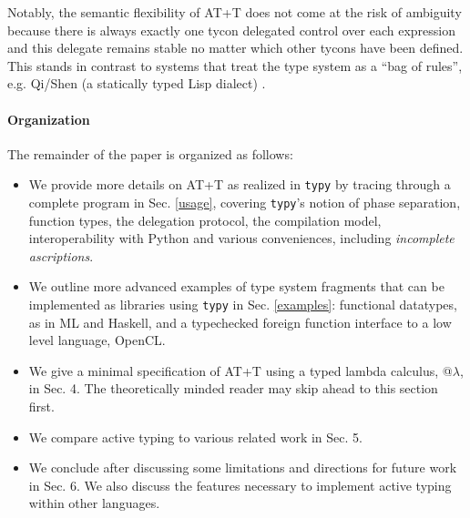\documentclass[preprint,10pt]{sigplanconf}
\begin{document}

Notably, the semantic flexibility of AT+T does not come at the risk of ambiguity  because there is always exactly one tycon delegated  control over each expression and this delegate remains stable no matter which other tycons have been defined. This stands in contrast to systems that treat the type system as a ``bag of rules'', e.g. Qi/Shen (a statically typed Lisp dialect) \cite{tarver2008functional}.%


\paragraph{Organization} The remainder of the paper is organized as follows:
\begin{itemize}
\item We provide more details on AT+T as realized in \verb|typy| by tracing through a complete program in Sec. \ref{usage}, covering \verb|typy|'s notion of {phase separation}, function types, the delegation protocol, the compilation model, interoperability with Python  and various conveniences, including \emph{incomplete ascriptions}.
\item We outline more advanced examples of type system fragments that can be implemented as libraries using \verb|typy| in Sec. \ref{examples}: functional datatypes, as in ML and Haskell, and a typechecked foreign function interface to a low level language, OpenCL. 
\item We give a minimal specification of AT+T using a typed lambda calculus, @$\lambda$, in Sec. 4. The theoretically minded reader may skip ahead to this section first.
\item We compare active typing to various related work in Sec. 5.
\item We conclude after discussing some limitations and directions for future work in Sec. 6. We also discuss the features necessary to implement active typing within other languages.
\end{itemize}
\end{document}
